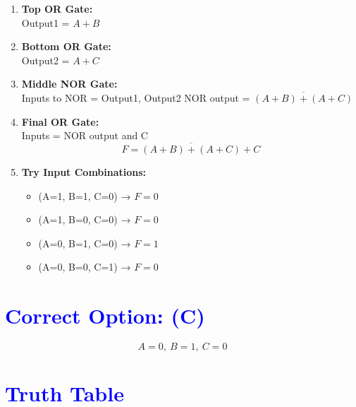 \documentclass[twocolumn]{article}
\begin{document}
\begin{enumerate}[label=\textbf{Step \arabic*:}]
    \item \textbf{Top OR Gate:} \\
    Output1 = $A + B$

    \item \textbf{Bottom OR Gate:} \\
    Output2 = $A + C$

    \item \textbf{Middle NOR Gate:} \\
    Inputs to NOR = Output1, Output2  
    NOR output = $\overline{(A + B) + (A + C)}$

    \item \textbf{Final OR Gate:} \\
    Inputs = NOR output and C  
    \[
    F = \overline{(A + B) + (A + C)} + C
    \]

    \item \textbf{Try Input Combinations:}

    \begin{itemize}
        \item (A=1, B=1, C=0) → $F=0$  
        \item (A=1, B=0, C=0) → $F=0$  
        \item (A=0, B=1, C=0) → $F=1$ 
        \item (A=0, B=0, C=1) → $F=0$
    \end{itemize}
\end{enumerate}

\section*{\textcolor{blue}{Correct Option: (C)}}
\[
\boxed{A = 0,\ B = 1,\ C = 0}
\]

\section*{\textcolor{blue}{Truth Table}}
\end{document}
